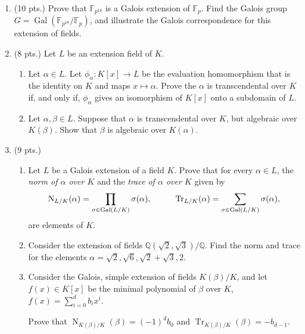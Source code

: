 \documentclass[11pt]{report}
\newcommand\QQ{\mathbb Q}
\newcommand\F{\mathbb F}
\newcommand\Gal{\operatorname{Gal}}
\newcommand\norm{\operatorname{N}}
\newcommand\trace{\operatorname{Tr}}
\newcommand\dsp{\displaystyle}
\begin{document}
\begin{enumerate}
\item (10 pts.) Prove that $\F_{p^{18}}$
is a Galois extension of $\F_p$.  Find the Galois group $G = \Gal(\F_{p^{18}} / \F_p)$,
and illustrate the Galois correspondence for this extension of fields.


\item (8 pts.) Let $L$ be an extension field of $K$.

\begin{enumerate}

\item Let $\alpha \in L$.  Let $\phi_\alpha: K[x] \to L$ be the evaluation
homomorphism that is the identity on $K$ and maps $x \mapsto \alpha$.  Prove the $\alpha$ is transcendental
over $K$ if, and only if, $\phi_\alpha$ gives an isomorphism of $K[x]$ onto a subdomain of $L$.

\item Let $\alpha, \beta \in L$.  Suppose that $\alpha$ is transcendental
over $K$, but algebraic over $K(\beta)$.  Show that $\beta$ is algebraic over $K(\alpha)$.

\end{enumerate}

\item (9 pts.)

\begin{enumerate}

\item Let $L$ be a Galois extension of a field $K$.  Prove that for every $\alpha \in L$, the
\emph{norm of $\alpha$ over $K$} and the \emph{trace of $\alpha$ over $K$} given by 
$$
\norm_{L/K}( \alpha ) = \prod_{\sigma \in \Gal (L/K)} \sigma(\alpha), \hskip 1cm
\trace_{L/K}( \alpha ) = \sum_{\sigma \in \Gal (L/K)} \sigma(\alpha),
$$
are elements of $K$.

\item Consider the extension of fields $\QQ(\sqrt{2}, \sqrt{3}) / \QQ$.  Find the norm and trace
for the elements $\alpha = \sqrt{2}, \sqrt{6}, \sqrt{2} + \sqrt{3}, 2$.

\item Consider the Galois, simple extension of fields $K(\beta) / K$, and let $f(x) \in K[x]$
be the minimal polynomial of $\beta$ over $K$, $\dsp f(x) = \sum_{i=0}^d b_i x^i$.

Prove that $\norm_{K(\beta) / K} (\beta) = {(-1)}^d b_0$ and $\trace_{K(\beta) / K} (\beta) = -b_{d-1}.$

\end{enumerate}


\end{enumerate}
\end{document}
